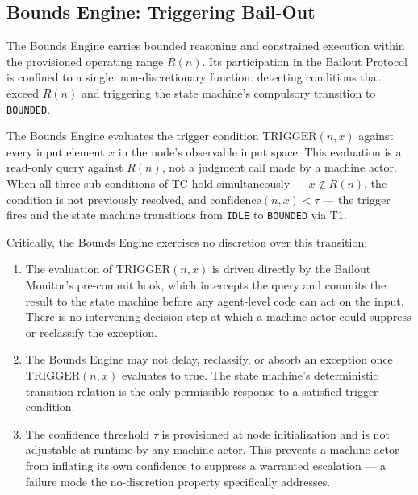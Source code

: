 \subsection{Bounds Engine: Triggering Bail-Out}\label{sec:bounds-trigger}

The Bounds Engine carries bounded reasoning and constrained execution within the provisioned operating range $R(n)$. Its participation in the Bailout Protocol is confined to a single, non-discretionary function: detecting conditions that exceed $R(n)$ and triggering the state machine's compulsory transition to \texttt{BOUNDED}.

The Bounds Engine evaluates the trigger condition $\text{TRIGGER}(n, x)$ against every input element $x$ in the node's observable input space. This evaluation is a read-only query against $R(n)$, not a judgment call made by a machine actor. When all three sub-conditions of TC hold simultaneously --- $x \notin R(n)$, the condition is not previously resolved, and $\text{confidence}(n, x) < \tau$ --- the trigger fires and the state machine transitions from \texttt{IDLE} to \texttt{BOUNDED} via T1.

Critically, the Bounds Engine exercises no discretion over this transition:

\begin{enumerate}\itemsep=0pt
\item The evaluation of $\text{TRIGGER}(n, x)$ is driven directly by the Bailout Monitor's pre-commit hook, which intercepts the query and commits the result to the state machine before any agent-level code can act on the input. There is no intervening decision step at which a machine actor could suppress or reclassify the exception.

\item The Bounds Engine may not delay, reclassify, or absorb an exception once $\text{TRIGGER}(n, x)$ evaluates to true. The state machine's deterministic transition relation is the only permissible response to a satisfied trigger condition.

\item The confidence threshold $\tau$ is provisioned at node initialization and is not adjustable at runtime by any machine actor. This prevents a machine actor from inflating its own confidence to suppress a warranted escalation --- a failure mode the no-discretion property specifically addresses.
\end{enumerate}

